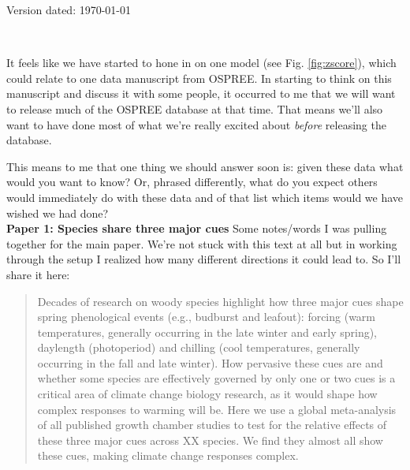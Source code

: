 \documentclass[11pt,letterpaper]{article}
\begin{document}
\begin{flushright}
Version dated: \today
\end{flushright}
\thispagestyle{empty}
\bigskip
\medskip
\begin{center}
\\
\vspace{2ex}
\bigskip
\end{center}


It feels like we have started to hone in on one model (see Fig. \ref{fig:zscore}), which could relate to one data manuscript from OSPREE. In starting to think on this manuscript and discuss it with some people, it occurred to me that we will want to release much of the OSPREE database at that time. That means we'll also want to have done most of what we're really excited about \emph{before} releasing the database. 

This means to me that one thing we should answer soon is: given these data what would you want to know? Or, phrased differently, what do you expect others would immediately do with these data and of that list which items would we have wished we had done? \\


{\bf Paper 1: Species share three major cues} %
Some notes/words I was pulling together for the main paper. We're not stuck with this text at all but in working through the setup I realized how many different directions it could lead to. So I'll share it here:

\begin{abstract}
Decades of research on woody species highlight how three major cues shape spring phenological events (e.g., budburst and leafout): forcing (warm temperatures, generally occurring in the late winter and early spring), daylength (photoperiod) and chilling (cool temperatures, generally occurring in the fall and late winter). How pervasive these cues are and whether some species are effectively governed by only one or two cues is a critical area of climate change biology research, as it would shape how complex responses to warming will be. Here we use a global meta-analysis of all published growth chamber studies to test for the relative effects of these three major cues across XX species. We find they almost all show these cues, making climate change responses complex. 
\end{abstract}
\end{document}
